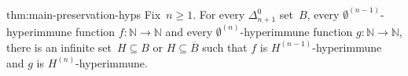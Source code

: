 \documentclass{article}
\def\NN{\mathbb{N}}
\newtheorem{theorem}{Theorem}
\numberwithin{theorem}{section}
\theoremstyle{definition}
\begin{document}
\begin{repmaintheorem}{thm:main-preservation-hyps}
Fix~$n \geq 1$. For every $\Delta^0_{n+1}$ set~$B$, every $\emptyset^{(n-1)}$-hyperimmune function $f : \NN \to \NN$ and every $\emptyset^{(n)}$-hyperimmune function $g : \NN \to \NN$, there is an infinite set~$H \subseteq B$ or $H \subseteq \overline{B}$ such that $f$ is $H^{(n-1)}$-hyperimmune and $g$ is $H^{(n)}$-hyperimmune.
\end{repmaintheorem}
\end{document}
